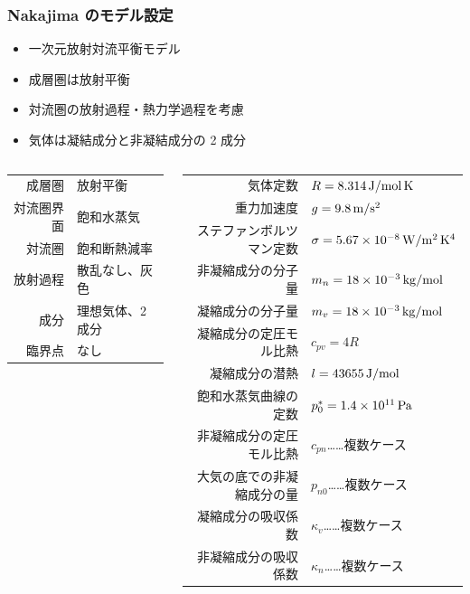 \documentclass[aspectratio=149]{beamer}
\newcommand{\hme}[1]{\times10^{#1}}
\begin{document}
\begin{frame}
	\frametitle{Nakajima \etal のモデル設定}
	\begin{itemize}
		\item 一次元放射対流平衡モデル
		\item 成層圏は放射平衡
		\item 対流圏の放射過程・熱力学過程を考慮
		\item 気体は凝結成分と非凝結成分の 2 成分
	\end{itemize}
	\begin{columns}[T]
		\begin{column}{.35\textwidth}
			\small
				\centering
				\begin{tabular}{rl}
					\hline
					成層圏&放射平衡\\
					対流圏界面&飽和水蒸気\\
					対流圏&飽和断熱減率\\
					放射過程&散乱なし、灰色\\
					成分&理想気体、2 成分\\
					臨界点&なし\\
					\hline
				\end{tabular}
		\end{column}
		\begin{column}{.6\textwidth}
			\tiny
			\centering
				\begin{tabular}{rl}
					\hline
					気体定数&\(R=8.314\hmu{J/mol\,K}\)\\
					重力加速度&\(g=9.8\hmu{m/s^2}\)\\
					ステファンボルツマン定数&\(\sigma=5.67\hme{-8}\hmu{W/m^2\,K^4}\)\\
					\hline
					非凝縮成分の分子量&\(m_n=18\hme{-3}\hmu{kg/mol}\)\\
					凝縮成分の分子量&\(m_v=18\hme{-3}\hmu{kg/mol}\)\\
					凝縮成分の定圧モル比熱&\(c_{pv}=4R\)\\
					凝縮成分の潜熱&\(l=43655\hmu{J/mol}\)\\
					飽和水蒸気曲線の定数&\(p^*_0=1.4\hme{11}\hmu{Pa}\)\\
					非凝縮成分の定圧モル比熱&\(c_{pn}\)……複数ケース\\
					大気の底での非凝縮成分の量&\(p_{n0}\)……複数ケース\\
					凝縮成分の吸収係数&\(\kappa_{v}\)……複数ケース\\
					非凝縮成分の吸収係数&\(\kappa_{n}\)……複数ケース\\
					\hline
				\end{tabular}
		\end{column}
	\end{columns}
\end{frame}
\end{document}
